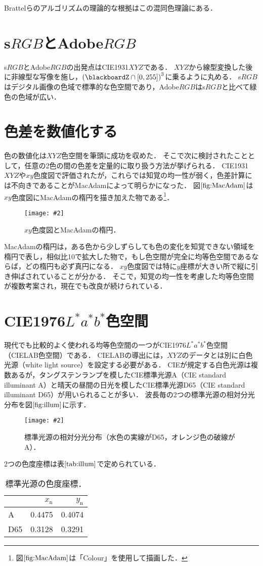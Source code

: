 \documentclass[uplatex,paper=a4,fontsize=4.0truemm,jafontsize=4.0truemm,head_space=30.0truemm,foot_space=30.0truemm,baselineskip=8.0truemm,line_length=40zw,gutter=25.0truemm,oneside,openany,fleqn,hanging_panctuation,open_bracket_pos=nibu_tentsuki,dvipdfmx,jis2004,book,titlepage]{jlreq}
\theoremstyle{mystyle}
\newcommand{\captiondot}[1]{\caption{#1．}}
\newcommand{\figureinput}[4]{\begin{figure}[tbp]\centering\texttt{[image: \#2]}\captiondot{#3}\label{fig:#4}\end{figure}}
\newcommand{\tableinput}[4]{\begin{table}[tbp]\centering\captiondot{#3}\label{tab:#4}\begin{tabular}{#1}#2\end{tabular}\end{table}}
\newcommand{\mathdisplaystyle}[1]{\(\displaystyle{#1}\)}
\newcommand{\Reference}[1]{\mathdisplaystyle{\ref{#1}}}
\newcommand{\parentheses}[1]{\left(#1\right)}
\newcommand{\squarebrackets}[1]{\left[#1\right]}
\begin{document}
				Brattelらのアルゴリズムの理論的な根拠はこの混同色理論にある．
		\section{s\mathdisplaystyle{RGB}とAdobe\mathdisplaystyle{RGB}}
			s\mathdisplaystyle{RGB}とAdobe\mathdisplaystyle{RGB}の出発点はCIE1931\mathdisplaystyle{XYZ}である．
			\mathdisplaystyle{XYZ}から線型変換した後に非線型な写像を施し，\mathdisplaystyle{\parentheses{\blackboardZ\cap\squarebrackets{0,255}}^3}に乗るように丸める．
			s\mathdisplaystyle{RGB}はデジタル画像の色域で標準的な色空間であり，Adobe\mathdisplaystyle{RGB}はs\mathdisplaystyle{RGB}と比べて緑色の色域が広い．
		\section{色差を数値化する}
			色の数値化は\mathdisplaystyle{XYZ}色空間を筆頭に成功を収めた．
			そこで次に検討されたこととして，任意の2色の間の色差を定量的に取り扱う方法が挙げられる．
			CIE1931\mathdisplaystyle{XYZ}や\mathdisplaystyle{xy}色度図で評価されたが，これらでは知覚の均一性が弱く，色差計算には不向きであることがMacAdamによって明らかになった\cite{MacAdam1942}．
			図\Reference{fig:MacAdam}は\mathdisplaystyle{xy}色度図にMacAdamの楕円を描き加えた物である\footnote{図\Reference{fig:MacAdam}は「Colour」を使用して描画した．}．
			\figureinput{width=\linewidth}{D:/a/figs/MacAdam.png}{\mathdisplaystyle{xy}色度図とMacAdamの楕円}{MacAdam}
			MacAdamの楕円は，ある色から少しずらしても色の変化を知覚できない領域を楕円で表し，相似比10で拡大した物で，もし色空間が完全に均等色空間であるならば，どの楕円も必ず真円になる．
			\mathdisplaystyle{xy}色度図では特に\mathdisplaystyle{y}座標が大きい所で縦に引き伸ばされていることが分かる．
			そこで，知覚の均一性を考慮した均等色空間が複数考案され，現在でも改良が続けられている．
		\section{CIE1976\mathdisplaystyle{L^\ast a^\ast b^\ast}色空間}
			現代でも比較的よく使われる均等色空間の一つがCIE1976\mathdisplaystyle{L^\ast a^\ast b^\ast}色空間（CIELAB色空間）である．
			CIELABの導出には，\mathdisplaystyle{XYZ}のデータとは別に白色光源（white light source）を設定する必要がある．
			CIEが規定する白色光源は複数あるが，タングステンランプを模したCIE標準光源A（CIE standard illuminant A）と晴天の昼間の日光を模したCIE標準光源D65（CIE standard illuminant D65）が用いられることが多い．
			波長毎の2つの標準光源の相対分光分布を図\Reference{fig:illum}に示す．
			\figureinput{width=\linewidth}{D:/a/figs/illuminant.png}{標準光源の相対分光分布（水色の実線がD65，オレンジ色の破線がA）}{illum}
			2つの色度座標は表\Reference{tab:illum}で定められている．
			\tableinput{l|rr}{ & \(x_\textrm{n}\) & \(y_\textrm{n}\) \\ \hline
				A & 0.4475 & 0.4074 \\
				D65 & 0.3128 & 0.3291}{標準光源の色度座標}{illum}
\end{document}
